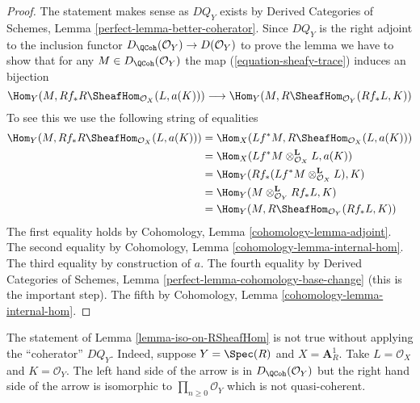 \begin{proof}
The statement makes sense as $DQ_Y$ exists by
Derived Categories of Schemes, Lemma \ref{perfect-lemma-better-coherator}.
Since $DQ_Y$ is the right adjoint to the inclusion
functor $D_\QCoh(\mathcal{O}_Y) \to D(\mathcal{O}_Y)$
to prove the lemma we have to show that for any $M \in D_\QCoh(\mathcal{O}_Y)$
the map (\ref{equation-sheafy-trace}) induces an bijection
$$
\Hom_Y(M, Rf_*R\SheafHom_{\mathcal{O}_X}(L, a(K)))
\longrightarrow
\Hom_Y(M, R\SheafHom_{\mathcal{O}_Y}(Rf_*L, K))
$$
To see this we use the following string of equalities
\begin{align*}
\Hom_Y(M, Rf_*R\SheafHom_{\mathcal{O}_X}(L, a(K)))
& =
\Hom_X(Lf^*M, R\SheafHom_{\mathcal{O}_X}(L, a(K))) \\
& =
\Hom_X(Lf^*M \otimes_{\mathcal{O}_X}^\mathbf{L} L, a(K)) \\
& =
\Hom_Y(Rf_*(Lf^*M \otimes_{\mathcal{O}_X}^\mathbf{L} L), K) \\
& =
\Hom_Y(M \otimes_{\mathcal{O}_Y}^\mathbf{L} Rf_*L, K) \\
& =
\Hom_Y(M, R\SheafHom_{\mathcal{O}_Y}(Rf_*L, K))
\end{align*}
The first equality holds by Cohomology, Lemma \ref{cohomology-lemma-adjoint}.
The second equality by Cohomology, Lemma \ref{cohomology-lemma-internal-hom}.
The third equality by construction of $a$.
The fourth equality by Derived Categories of Schemes, Lemma
\ref{perfect-lemma-cohomology-base-change} (this is the important step).
The fifth by Cohomology, Lemma \ref{cohomology-lemma-internal-hom}.
\end{proof}

\begin{example}
\label{example-iso-on-RSheafHom}
The statement of Lemma \ref{lemma-iso-on-RSheafHom} is not true without
applying the ``coherator'' $DQ_Y$. Indeed, suppose $Y = \Spec(R)$ and
$X = \mathbf{A}^1_R$. Take $L = \mathcal{O}_X$ and $K = \mathcal{O}_Y$.
The left hand side of the arrow is in $D_\QCoh(\mathcal{O}_Y)$ but
the right hand side of the arrow is isomorphic to
$\prod_{n \geq 0} \mathcal{O}_Y$ which is not quasi-coherent.
\end{example}


